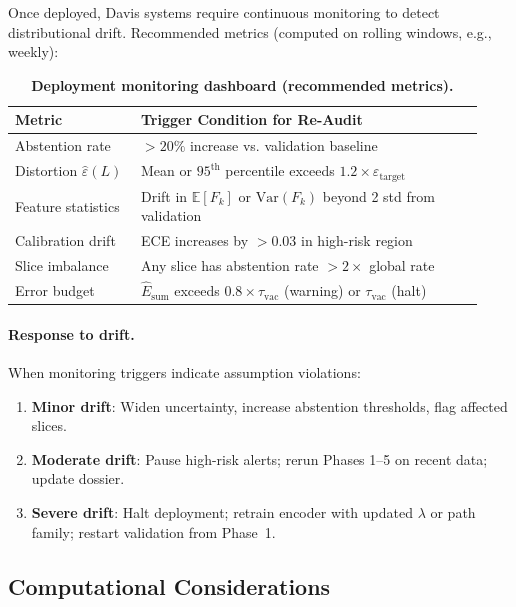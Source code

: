 \documentclass[11pt]{article}
\theoremstyle{remark}
\theoremstyle{plain}
\begin{document}
Once deployed, Davis systems require continuous monitoring to detect distributional drift. Recommended metrics (computed on rolling windows, e.g., weekly):

\begin{table}[H]
\centering
\caption{\textbf{Deployment monitoring dashboard (recommended metrics).}}
\label{tab:monitoring-dashboard}
\begin{tabularx}{\linewidth}{@{}p{0.25\linewidth}p{0.68\linewidth}@{}}
\toprule
\textbf{Metric} & \textbf{Trigger Condition for Re-Audit} \\
\midrule
Abstention rate & $>20\%$ increase vs. validation baseline \\
Distortion $\hat\varepsilon(L)$ & Mean or $95^{\text{th}}$ percentile exceeds $1.2 \times \varepsilon_{\text{target}}$ \\
Feature statistics & Drift in $\mathbb{E}[F_k]$ or $\text{Var}(F_k)$ beyond 2 std from validation \\
Calibration drift & ECE increases by $>0.03$ in high-risk region \\
Slice imbalance & Any slice has abstention rate $>2\times$ global rate \\
Error budget & $\hat E_{\text{sum}}$ exceeds $0.8 \times \tau_{\mathrm{vac}}$ (warning) or $\tau_{\mathrm{vac}}$ (halt) \\
\bottomrule
\end{tabularx}
\end{table}

\paragraph{Response to drift.}
When monitoring triggers indicate assumption violations:
\begin{enumerate}[label=(\alph*),leftmargin=*]
  \item \textbf{Minor drift}: Widen uncertainty, increase abstention thresholds, flag affected slices.
  \item \textbf{Moderate drift}: Pause high-risk alerts; rerun Phases 1--5 on recent data; update dossier.
  \item \textbf{Severe drift}: Halt deployment; retrain encoder with updated $\lambda$ or path family; restart validation from Phase~1.
\end{enumerate}

\subsection{Computational Considerations}
\label{subsec:computational-ops}
\end{document}
